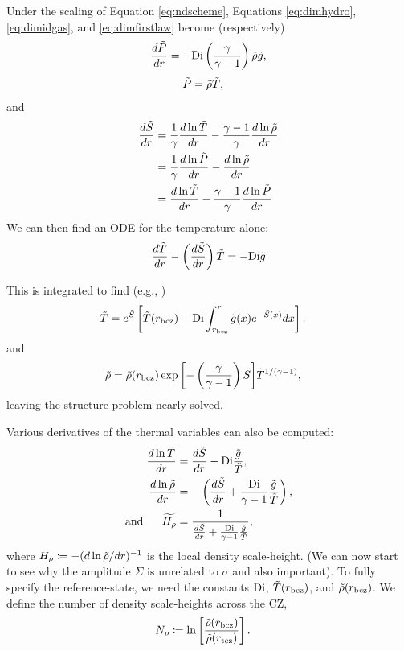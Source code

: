 \documentclass[12pt]{article}
\numberwithin{equation}{section}
\begin{document}
Under the scaling of Equation \eqref{eq:ndscheme}, Equations \eqref{eq:dimhydro}, \eqref{eq:dimidgas}, and \eqref{eq:dimfirstlaw} become (respectively)
\begin{align}\label{eq:hydro}
	\frac{d\tilde{P}}{dr}= -{\rm{Di}}\left(\frac{\gamma}{\gamma-1}\right)\tilde{\rho} \tilde{g},
\end{align}
\begin{align}
	\tilde{P} &= \tilde{\rho} \tilde{T},\label{eq:idgas}
\end{align}
and
\begin{subequations}\label{eq:firstlaw}
	\begin{align}
		\frac{d\tilde{S}}{dr}&=\frac{1}{\gamma}\frac{d\ln\tilde{T}}{dr} - \frac{\gamma - 1}{\gamma}\frac{d\ln\tilde{\rho}}{dr}\label{eq:firstlawtmprho}\\
		&=\frac{1}{\gamma}\frac{d\ln\tilde{P}}{dr} - \frac{d\ln\tilde{\rho}}{dr}\label{eq:firstlawprsrho}\\
		&= \frac{d\ln\tilde{T}}{dr} - \frac{\gamma - 1}{\gamma}\frac{d\ln\tilde{P}}{dr}\label{eq:firstlawtmpprs}
	\end{align}
\end{subequations}
We can then find an ODE for the temperature alone:
\begin{align}
	\frac{d\tilde{T}}{dr}-\left(\frac{d\tilde{S}}{dr}\right)\tilde{T} = - {\rm{Di}} \tilde{g}
\end{align}

This is integrated to find (e.g., \citealt{Matilsky2024})
\begin{align}\label{eq:tmptilde}
	\tilde{T} &= e^{\tilde{S}}\left[\tilde{T}(r_{\rm bcz}) - {\rm{Di}}\int_{r_{\rm bcz}}^r \tilde{g}(x)  e^{-\tilde{S}(x)}dx\right].
\end{align}
and
\begin{align}\label{eq:rhotilde}
	\tilde{\rho} &= \tilde{\rho}(r_{\rm bcz}) \exp{\left[-\left(\frac{\gamma}{\gamma-1}\right)\tilde{S}\right]}\tilde{T}^{1/(\gamma-1)},
\end{align}
leaving the structure problem nearly solved. 

Various derivatives of the thermal variables can also be computed:
\begin{align}
	\frac{d\ln\tilde{T}}{dr} &= \frac{d\tilde{S}}{dr} - {\rm{Di}} \frac{\tilde{g}}{\tilde{T}},\\
	\frac{d\ln\tilde{\rho}}{dr} &= -\left(\frac{d\tilde{S}}{dr} + \frac{{\rm{Di}}}{\gamma-1}\frac{\tilde{g}}{\tilde{T}}\right),\\
	\text{and}\ \ \ \ \  \widetilde{H_\rho} &=\frac{1}{\frac{d\tilde{S}}{dr} + \frac{{\rm{Di}}}{\gamma-1}\frac{\tilde{g}}{\tilde{T}}},
\end{align}
where $H_\rho\coloneqq-(d\ln\tilde{\rho}/dr)^{-1}$ is the local density scale-height. (We can now start to see why the amplitude $\Sigma$ is unrelated to $\sigma$ and also important). 
To fully specify the reference-state, we need the constants ${\rm{Di}}$, $\tilde{T}(r_{\rm bcz})$, and $\tilde{\rho}(r_{\rm bcz})$. We define the number of density scale-heights across the CZ, 
\begin{align}\label{eq:nrho}
	N_\rho &\coloneqq \ln\left[\frac{\tilde{\rho}(r_{\rm bcz})}{\tilde{\rho}(r_{\rm tcz})}\right].
\end{align}
\end{document}
